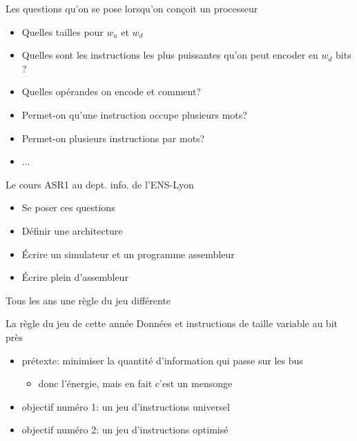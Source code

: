 \documentclass[slidetop,11pt,table]{beamer}
\begin{document}
\begin{frame}{Les questions qu'on se pose lorsqu'on conçoit un processeur}
  \begin{itemize}
  \item Quelles tailles pour $w_a$ et $w_d$
  \item Quelles sont les instructions les plus puissantes qu'on peut encoder en $w_d$ bits ?
  \item Quelles opérandes on encode et comment?
    
  \item Permet-on qu'une instruction occupe plusieurs mots?
  \item Permet-on plusieurs instructions par mots?
  \item ...
    
  \end{itemize}
\end{frame}

\begin{frame}{Le cours ASR1 au dept. info. de l'ENS-Lyon}
  \begin{itemize}
  \item Se poser ces questions
  \item Définir une architecture
  \item Écrire un simulateur et un programme assembleur
  \item Écrire plein d'assembleur
  \end{itemize}
  Tous les ans une règle du jeu différente 
\end{frame}




\begin{frame}{La règle du jeu de cette année}
Données et instructions de taille variable au bit près
  \begin{itemize}
  \item prétexte: minimiser la quantité d'information qui passe sur les bus
    \begin{itemize}
    \item donc l'énergie, mais en fait c'est un mensonge
    \end{itemize}
  \item objectif numéro 1: un jeu d'instructions universel
  \item objectif numéro 2: un jeu d'instructions optimisé
  \end{itemize}
  
\end{frame}
\end{document}

